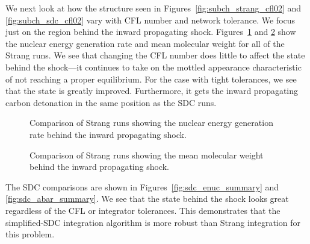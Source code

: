 \documentclass[times,preprint]{aastex631}
\newcommand{\isotm}[2]{{}^{#2}\mathrm{#1}}
\begin{document}


We next look at how the structure seen in
Figures~\ref{fig:subch_strang_cfl02} and \ref{fig:subch_sdc_cfl02}
vary with CFL number and network tolerance.  We focus just on the
region behind the inward propagating shock.
Figures~\ref{fig:strang_enuc_summary} and
\ref{fig:strang_abar_summary} show the nuclear energy generation rate
and mean molecular weight for all of the Strang runs.  We see that
changing the CFL number does little to affect the state behind the
shock---it continues to take on the mottled appearance characteristic
of not reaching a proper equilibrium.  For the case with tight tolerances, we
see that the state is greatly improved.  Furthermore, it gets the inward
propagating carbon detonation in the same position as the SDC runs.

\begin{figure}
\caption{\label{fig:strang_enuc_summary} Comparison of Strang runs showing
the nuclear energy generation rate behind the inward propagating
shock.}
\end{figure}

\begin{figure}
\caption{\label{fig:strang_abar_summary} Comparison of Strang runs showing
the mean molecular weight behind the inward propagating
shock.}
\end{figure}

The SDC comparisons are shown in Figures~\ref{fig:sdc_enuc_summary}
and \ref{fig:sdc_abar_summary}.  We see that the state behind the
shock looks great regardless of the CFL or integrator tolerances.
This demonstrates that the simplified-SDC integration algorithm is more
robust than Strang integration for this problem.
\end{document}
